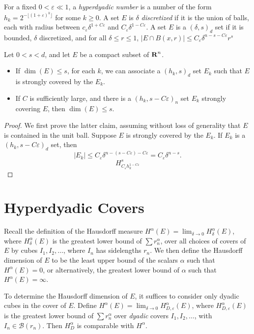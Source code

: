 For a fixed $0 < \varepsilon \ll 1$, a \emph{hyperdyadic number} is a number of the form $h_k = 2^{-\lfloor (1 + \varepsilon)^k \rfloor}$ for some $k \geq 0$. A set $E$ is \emph{$\delta$ discretized} if it is the union of balls, each with radius between $c_\varepsilon \delta^{1 + C\varepsilon}$ and $C_\varepsilon \delta^{1-C\varepsilon}$. A set $E$ is a $(\delta,s)_d$ set if it is bounded, $\delta$ discretized, and for all $\delta \leq r \leq 1$, $|E \cap B(x,r)| \leq C_\varepsilon \delta^{n-s-C\varepsilon} r^s$

\begin{lemma}
	Let $0 < s < d$, and let $E$ be a compact subset of $\operatorname{\mathbf{R}}^n$.
	\begin{itemize}
		\item If $\dim(E) \leq s$, for each $k$, we can associate a $(h_k,s)_d$ set $E_k$ such that $E$ is strongly covered by the $E_k$.

		\item If $C$ is sufficiently large, and there is a $(h_k, s - C\varepsilon)_n$ set $E_k$ strongly covering $E$, then $\dim(E) \leq s$.
	\end{itemize}
\end{lemma}
\begin{proof}
	We first prove the latter claim, assuming without loss of generality that $E$ is contained in the unit ball. Suppose $E$ is strongly covered by the $E_k$. If $E_k$ is a $(h_k,s - C\varepsilon)_d$ set, then
	\[ |E_k| \leq C_\varepsilon \delta^{n-(s-C\varepsilon)-C\varepsilon} = C_\varepsilon \delta^{n-s}. \]
	\[ H^s_{C_\varepsilon h_k^{1 - C\varepsilon}} \]
\end{proof}

\section{Hyperdyadic Covers}

Recall the definition of the Hausdorff measure $H^\alpha(E) = \lim_{\delta \to 0} H^\alpha_\delta(E)$, where $H^\alpha_\delta(E)$ is the greatest lower bound of $\sum r_n^\alpha$, over all choices of covers of $E$ by cubes $I_1, I_2, \dots$, where $I_n$ has sidelengths $r_n$. We then define the Hausdorff dimension of $E$ to be the least upper bound of the scalars $\alpha$ such that $H^\alpha(E) = 0$, or alternatively, the greatest lower bound of $\alpha$ such that $H^\alpha(E) = \infty$.

To determine the Hausdorff dimension of $E$, it suffices to consider only dyadic cubes in the cover of $E$. Define $H^\alpha(E) = \lim_{\delta \to 0} H^\alpha_{D,\varepsilon}(E)$, where $H^\alpha_{D,\varepsilon}(E)$ is the greatest lower bound of $\sum r_n^\alpha$ over \emph{dyadic} covers $I_1, I_2, \dots$, with $I_n \in \mathcal{B}(r_n)$. Then $H^\alpha_D$ is comparable with $H^\alpha$.

